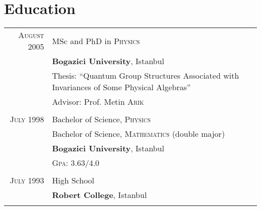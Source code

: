 \documentclass[a4paper,10pt]{article}
\begin{document}
\section{Education}
\begin{longtable}{r|p{11cm}} 
  \textsc{August} 2005  & MSc and PhD in \textsc{Physics} \\
                        & \textbf{Bogazici University}, Istanbul\\
                        & Thesis: ``Quantum Group Structures Associated with Invariances of Some Physical Algebras'' \\
                        & \small Advisor: Prof. Metin \textsc{Arik}\\
  \multicolumn{2}{c}{} \\

  \textsc{July} 1998    & Bachelor of Science, \textsc{Physics} \\
                        & Bachelor of Science, \textsc{Mathematics} (double major) \\
                        & \normalsize\textbf{Bogazici University}, Istanbul \\
                        & \normalsize \textsc{Gpa}: 3.63/4.0 \\
  \multicolumn{2}{c}{} \\

  \textsc{July} 1993    & High School \\
                        & \normalsize\textbf{Robert College}, Istanbul \\
  \multicolumn{2}{c}{} \\
\end{longtable}

\newpage 
\end{document}

